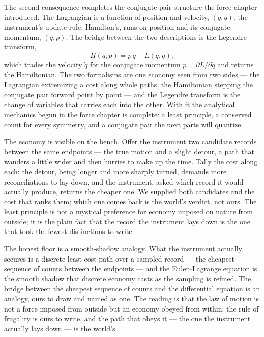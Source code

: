 The second consequence completes the conjugate-pair structure the force chapter introduced. The Lagrangian is
a function of position and velocity, $(q, \dot q)$; the instrument's update rule, Hamilton's, runs on position
and its conjugate momentum, $(q, p)$. The bridge between the two descriptions is the Legendre transform,
\begin{equation}
  H(q, p) = p\,\dot q - L(q, \dot q),
\end{equation}
which trades the velocity $\dot q$ for the conjugate momentum $p = \partial L/\partial \dot q$ and returns the
Hamiltonian. The two formalisms are one economy seen from two sides --- the Lagrangian extremizing a cost
along whole paths, the Hamiltonian stepping the conjugate pair forward point by point --- and the Legendre
transform is the change of variables that carries each into the other. With it the analytical mechanics begun
in the force chapter is complete: a least principle, a conserved count for every symmetry, and a conjugate
pair the next parts will quantize.

The economy is visible on the bench. Offer the instrument two candidate records between the same endpoints
--- the true motion and a slight detour, a path that wanders a little wider and then hurries to make up the
time. Tally the cost along each: the detour, being longer and more sharply turned, demands more
reconciliations to lay down, and the instrument, asked which record it would actually produce, returns the
cheaper one. We supplied both candidates and the cost that ranks them; which one comes back is the world's
verdict, not ours. The least principle is not a mystical preference for economy imposed on nature from
outside; it is the plain fact that the record the instrument lays down is the one that took the fewest
distinctions to write.

The honest floor is a smooth-shadow analogy. What the instrument actually secures is a discrete least-cost
path over a sampled record --- the cheapest sequence of counts between the endpoints --- and the
Euler--Lagrange equation is the smooth shadow that discrete economy casts as the sampling is refined. The
bridge between the cheapest sequence of counts and the differential equation is an analogy, ours to draw and
named as one. The reading is that the law of motion is not a force imposed from outside but an economy obeyed
from within: the rule of frugality is ours to write, and the path that obeys it --- the one the instrument
actually lays down --- is the world's.

